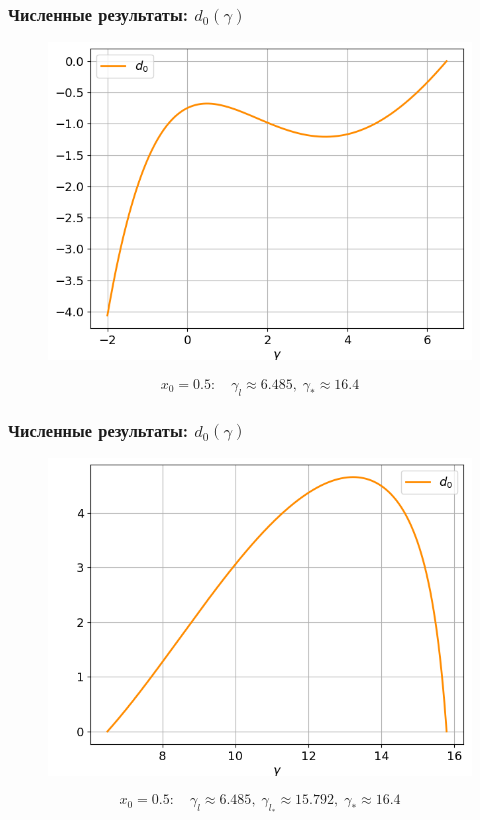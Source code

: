 \documentclass[fullscreen=true, unicode, bookmarks=false]{beamer}
\begin{document}
\begin{frame}
\frametitle{ Численные результаты: $ d_0(\gamma) $ }

\begin{figure} 
\includegraphics[scale=0.55]{divergent_d0_12_1.png}  
\end{figure}

$$ x_0 = 0.5: \quad \gamma_l \approx 6.485, \; \gamma_* \approx 16.4 $$

\end{frame}

\begin{frame}
\frametitle{ Численные результаты: $ d_0(\gamma) $ }

\begin{figure} 
\includegraphics[scale=0.55]{divergent_d0_12_2.png}  
\end{figure}

$$ x_0 = 0.5: \quad \gamma_l \approx 6.485, \; \gamma_{l_*} \approx 15.792, \; \gamma_* \approx 16.4 $$

\end{frame}
\end{document}
